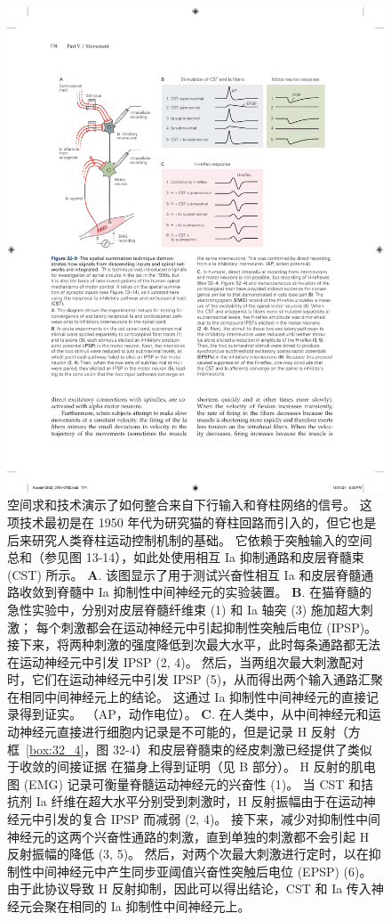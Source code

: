 \begin{figure}[htbp]
	\centering
	\includegraphics[width=0.9\linewidth]{chap32/fig_32_9}
	\caption{空间求和技术演示了如何整合来自下行输入和脊柱网络的信号。
	这项技术最初是在 1950 年代为研究猫的脊柱回路而引入的，但它也是后来研究人类脊柱运动控制机制的基础。
	它依赖于突触输入的空间总和（参见图 13-14），如此处使用相互 Ia 抑制通路和皮层脊髓束 (CST) 所示。
	\textbf{A}. 该图显示了用于测试兴奋性相互 Ia 和皮层脊髓通路收敛到脊髓中 Ia 抑制性中间神经元的实验装置。
	\textbf{B}. 在猫脊髓的急性实验中，分别对皮层脊髓纤维束 (1) 和 Ia 轴突 (3) 施加超大刺激； 每个刺激都会在运动神经元中引起抑制性突触后电位 (IPSP)。
	接下来，将两种刺激的强度降低到次最大水平，此时每条通路都无法在运动神经元中引发 IPSP (2, 4)。
	然后，当两组次最大刺激配对时，它们在运动神经元中引发 IPSP (5)，从而得出两个输入通路汇聚在相同中间神经元上的结论。
	这通过 Ia 抑制性中间神经元的直接记录得到证实。 （AP，动作电位）。
	\textbf{C}. 在人类中，从中间神经元和运动神经元直接进行细胞内记录是不可能的，但是记录 H 反射（方框~\ref{box:32_4}，图 32-4）和皮层脊髓束的经皮刺激已经提供了类似于收敛的间接证据 在猫身上得到证明（见 B 部分）。
	H 反射的肌电图 (EMG) 记录可衡量脊髓运动神经元的兴奋性 (1)。
	当 CST 和拮抗剂 Ia 纤维在超大水平分别受到刺激时，H 反射振幅由于在运动神经元中引发的复合 IPSP 而减弱 (2, 4)。
	接下来，减少对抑制性中间神经元的这两个兴奋性通路的刺激，直到单独的刺激都不会引起 H 反射振幅的降低 (3, 5)。
	然后，对两个次最大刺激进行定时，以在抑制性中间神经元中产生同步亚阈值兴奋性突触后电位 (EPSP) (6)。
	由于此协议导致 H 反射抑制，因此可以得出结论，CST 和 Ia 传入神经元会聚在相同的 Ia 抑制性中间神经元上。}
	\label{fig:32_9}
\end{figure}


